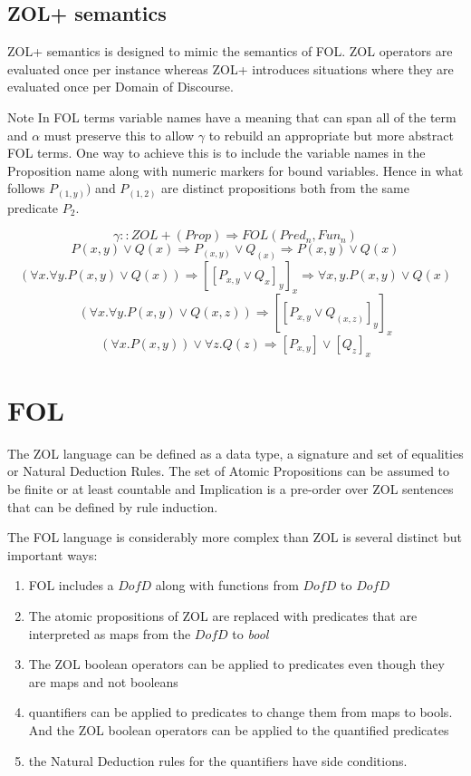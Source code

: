  \newpage 
 \subsection{ZOL+ semantics}
 ZOL+ semantics is designed to mimic the semantics of FOL.
 ZOL operators are evaluated once per instance whereas ZOL+ introduces situations where they are evaluated once per Domain of Discourse.
 
 
 
 
 Note  In FOL terms variable names have a meaning that can span all of the term and  $\alpha$ must preserve this to allow $\gamma$ to rebuild an appropriate but more abstract FOL terms. One way to achieve this is to include the variable names in the Proposition name along with numeric markers for bound variables. Hence in what follows $P_{(1,y)})$ and $P_{(1,2)}$ are distinct propositions both from the same predicate $P_2$.
 
 \[\gamma:: ZOL+(Prop) \Rightarrow FOL(Pred_{n},Fun_{n}) \] 
 \[ P(x,y) \vee Q(x) \Rightarrow P_{(x,y)}\vee Q_{(x)} \Rightarrow P(x,y) \vee Q(x) \]
 \[(\forall x.\forall y. P(x,y) \vee Q(x) ) \Rightarrow [[P_{x,y}\vee Q_{x}]_y]_x \Rightarrow  \forall x,y. P(x,y) \vee Q(x)\]
\[(\forall x. \forall y.P(x,y) \vee Q(x,z) ) \Rightarrow [[P_{x,y}\vee Q_{(x,z)}]_y]_x \] 
  \[(\forall x. P(x,y)) \vee \forall z. Q(z)  \Rightarrow [P_{x,y}] \vee [Q_{z}]_x \] %



\section{FOL}


The ZOL language can be defined as a data type, a signature and set of equalities or Natural Deduction Rules.  The set of Atomic Propositions can be assumed to be finite or at least countable and Implication is a pre-order over ZOL sentences that can be defined by rule induction.

The FOL language is considerably more complex than ZOL is several distinct but important ways:

\begin{enumerate}
\item FOL includes a $DofD$ along with functions from  $DofD$ to $DofD$ 

\item The atomic propositions of ZOL are replaced with predicates that are interpreted as maps from the $DofD$ to \emph{bool}


\item The ZOL boolean operators can be applied to predicates even though they are maps and not booleans

\item quantifiers can be applied to predicates  to change them from maps to bools. And the ZOL boolean operators can be applied to the quantified predicates

\item the Natural Deduction rules for the quantifiers have side conditions.
\end{enumerate}

